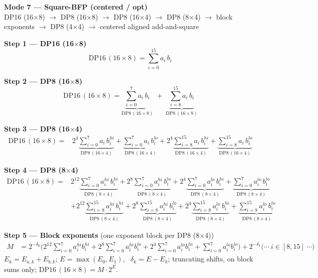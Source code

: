 \documentclass[fleqn]{article}
\newcommand{\DPop}[3]{\mathrm{DP#1}\,(#2\!\times\!#3)}
\begin{document}
\begin{center}
{\LARGE \textbf{Mode 7 --- Square-BFP (centered / opt)}}\\[4pt]
{\large DP16 (16$\times$8) $\rightarrow$ DP8 (16$\times$8) $\rightarrow$ DP8 (16$\times$4) $\rightarrow$ DP8 (8$\times$4) $\rightarrow$ block exponents $\rightarrow$ DP8 (4$\times$4) $\rightarrow$ centered aligned add-and-square}
\end{center}

\textbf{Step 1 --- DP16 (16$\times$8)}
\[
\DPop{16}{16}{8} = \sum_{i=0}^{15} a_i \, b_i
\]

\textbf{Step 2 --- DP8 (16$\times$8)}
\[
\DPop{16}{16}{8}
  = \underbrace{\sum_{i=0}^{7} a_i \, b_i}_{\DPop{8}{16}{8}}
  \; + \; \underbrace{\sum_{i=8}^{15} a_i \, b_i}_{\DPop{8}{16}{8}}
\]

\textbf{Step 3 --- DP8 (16$\times$4)}
\begin{align*}
\DPop{16}{16}{8} = {}
  & 2^{4}\underbrace{\sum_{i=0}^{7} a_i \, b_i^{hi}}_{\DPop{8}{16}{4}}
  + \underbrace{\sum_{i=0}^{7} a_i \, b_i^{lo}}_{\DPop{8}{16}{4}}
  + 2^{4}\underbrace{\sum_{i=8}^{15} a_i \, b_i^{hi}}_{\DPop{8}{16}{4}}
  + \underbrace{\sum_{i=8}^{15} a_i \, b_i^{lo}}_{\DPop{8}{16}{4}}
\end{align*}

\textbf{Step 4 --- DP8 (8$\times$4)}
\begin{align*}
\DPop{16}{16}{8} = {}
  & 2^{12}\underbrace{\sum_{i=0}^{7} a_i^{hi} \, b_i^{hi}}_{\DPop{8}{8}{4}}
  + 2^{8}\underbrace{\sum_{i=0}^{7} a_i^{hi} \, b_i^{lo}}_{\DPop{8}{8}{4}}
  + 2^{4}\underbrace{\sum_{i=0}^{7} a_i^{lo} \, b_i^{hi}}_{\DPop{8}{8}{4}}
  + \underbrace{\sum_{i=0}^{7} a_i^{lo} \, b_i^{lo}}_{\DPop{8}{8}{4}} \\[0.3em]
  & + 2^{12}\underbrace{\sum_{i=8}^{15} a_i^{hi} \, b_i^{hi}}_{\DPop{8}{8}{4}}
  + 2^{8}\underbrace{\sum_{i=8}^{15} a_i^{hi} \, b_i^{lo}}_{\DPop{8}{8}{4}}
  + 2^{4}\underbrace{\sum_{i=8}^{15} a_i^{lo} \, b_i^{hi}}_{\DPop{8}{8}{4}}
  + \underbrace{\sum_{i=8}^{15} a_i^{lo} \, b_i^{lo}}_{\DPop{8}{8}{4}}
\end{align*}

\textbf{Step 5 --- Block exponents}\quad
{\small(one exponent block per DP8 (8$\times$4))}
\begin{align*}
M &= 2^{-\delta_0}\Big( 2^{12}\!\sum_{i=0}^{7} a_i^{hi} b_i^{hi}
  + 2^{8}\!\sum_{i=0}^{7} a_i^{hi} b_i^{lo}
  + 2^{4}\!\sum_{i=0}^{7} a_i^{lo} b_i^{hi}
  + \sum_{i=0}^{7} a_i^{lo} b_i^{lo} \Big)
  + 2^{-\delta_1}\Big(\cdots\ i\!\in\![8,15]\ \cdots\Big)
\end{align*}
$E_k=E_{a,k}+E_{b,k}$; \quad $E=\max(E_0,E_1)$, \ $\delta_k=E-E_k$; \quad truncating shifts, on block sums only; \quad $\DPop{16}{16}{8}=M\cdot2^{E}$.
\end{document}
